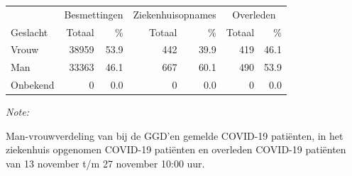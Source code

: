 \documentclass[
  english,
  man,floatsintext]{apa6}
\begin{document}
\begin{table}[H]
\centering\begingroup\fontsize{11}{13}\selectfont

\begin{threeparttable}
\begin{tabular}{lrrrrrr}
\toprule
\multicolumn{1}{c}{ } & \multicolumn{2}{c}{Besmettingen} & \multicolumn{2}{c}{Ziekenhuisopnames} & \multicolumn{2}{c}{Overleden} \\
\cmidrule(l{3pt}r{3pt}){2-3} \cmidrule(l{3pt}r{3pt}){4-5} \cmidrule(l{3pt}r{3pt}){6-7}
Geslacht & Totaal & \% & Totaal & \% & Totaal & \%\\
\midrule
Vrouw & 38959 & 53.9 & 442 & 39.9 & 419 & 46.1\\
Man & 33363 & 46.1 & 667 & 60.1 & 490 & 53.9\\
Onbekend & 0 & 0.0 & 0 & 0.0 & 0 & 0.0\\
\bottomrule
\end{tabular}
\begin{tablenotes}
\item \textit{Note: } 
\item Man-vrouwverdeling van bij de GGD’en gemelde COVID-19 patiënten, in het ziekenhuis opgenomen COVID-19 patiënten en overleden COVID-19 patiënten van 13 november t/m 27 november 10:00 uur.
\end{tablenotes}
\end{threeparttable}
\endgroup{}
\end{table}
\newpage
\end{document}
